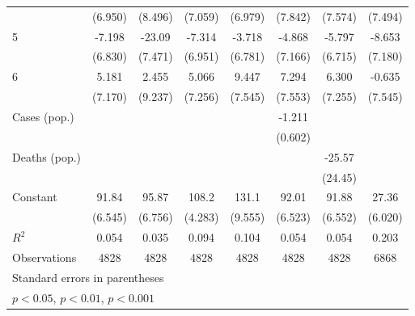 \documentclass{article}
\begin{document}
{\begin{longtable}{l*{7}{c}}
                &  (6.950)         &  (8.496)         &  (7.059)         &  (6.979)         &  (7.842)         &  (7.574)         &  (7.494)         \\
5               &   -7.198         &   -23.09\sym{**} &   -7.314         &   -3.718         &   -4.868         &   -5.797         &   -8.653         \\
                &  (6.830)         &  (7.471)         &  (6.951)         &  (6.781)         &  (7.166)         &  (6.715)         &  (7.180)         \\
6               &    5.181         &    2.455         &    5.066         &    9.447         &    7.294         &    6.300         &   -0.635         \\
                &  (7.170)         &  (9.237)         &  (7.256)         &  (7.545)         &  (7.553)         &  (7.255)         &  (7.545)         \\
Cases (pop.)    &                  &                  &                  &                  &   -1.211         &                  &                  \\
                &                  &                  &                  &                  &  (0.602)         &                  &                  \\
Deaths (pop.)   &                  &                  &                  &                  &                  &   -25.57         &                  \\
                &                  &                  &                  &                  &                  &  (24.45)         &                  \\
Constant        &    91.84\sym{***}&    95.87\sym{***}&    108.2\sym{***}&    131.1\sym{***}&    92.01\sym{***}&    91.88\sym{***}&    27.36\sym{***}\\
                &  (6.545)         &  (6.756)         &  (4.283)         &  (9.555)         &  (6.523)         &  (6.552)         &  (6.020)         \\
\hline
\(R^{2}\)       &    0.054         &    0.035         &    0.094         &    0.104         &    0.054         &    0.054         &    0.203         \\
Observations    &     4828         &     4828         &     4828         &     4828         &     4828         &     4828         &     6868         \\
\hline\hline
\multicolumn{8}{l}{\footnotesize Standard errors in parentheses}\\
\multicolumn{8}{l}{\footnotesize \sym{*} \(p<0.05\), \sym{**} \(p<0.01\), \sym{***} \(p<0.001\)}\\
\end{longtable}
}
\end{document}

